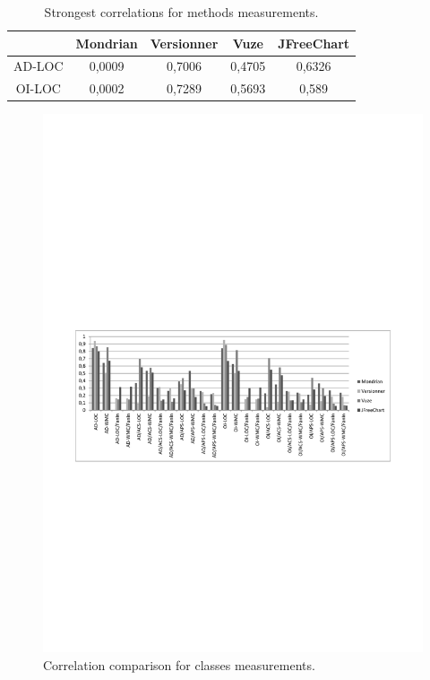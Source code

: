 \documentclass{sig-alternate}
\newcommand{\figlabel}[1]{\label{fig:#1}}
\begin{document}
\begin{table}
\begin{centering}
\begin{tabular}{|c|c|c|c|c|}
\hline 
 & Mondrian & Versionner & Vuze & JFreeChart\tabularnewline
\hline 
\hline 
AD-LOC & 0,0009 & 0,7006 & 0,4705 & 0,6326\tabularnewline
\hline 
OI-LOC & 0,0002 & 0,7289 & 0,5693 & 0,589\tabularnewline
\hline 
\end{tabular}
\par\end{centering}

\caption{Strongest correlations for methods measurements.\label{tab:correlations-Methods}}
\end{table}

\begin{figure}
\includegraphics[bb=52bp 300bp 540bp 500bp,clip]{ClassesMetricsComparison}

\caption{Correlation comparison for classes measurements.\figlabel{Correlation-comparison}}


\end{figure}
\end{document}
